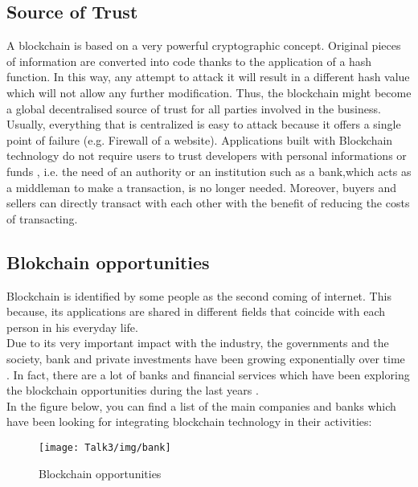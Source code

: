 \subsection{Source of Trust}
A blockchain is based on a very powerful cryptographic concept. Original pieces of information are converted into code thanks to the application of a hash function. In this way, any attempt to attack it will result in a different hash value which will not allow any further modification.
Thus, the blockchain might become a global decentralised source of trust \cite{blockchain3} for all parties involved in the business.\\
Usually, everything that is centralized is easy to attack because it offers a single point of failure (e.g. Firewall of a website). 
Applications built with Blockchain technology do not require users to trust developers with personal informations or funds \cite{blockchain3}, i.e. the need of an authority or an institution such as a bank,which acts as a middleman to make a transaction, is no longer needed. Moreover, buyers and sellers can directly transact with each other with the benefit of reducing the costs of transacting.

\subsection{Blokchain opportunities}
Blockchain is identified by some people as the second coming of internet. This because, its applications are shared in different fields that coincide with each person in his everyday life. \\
Due to its very important impact with the industry, the governments and the society, bank and private investments have been growing exponentially over time \cite{soci}. In fact, there are a lot of banks and financial services which have been exploring the blockchain opportunities during the last years \cite{soci}. \\

In the figure below, you can find a list of the main companies and banks which have been looking for integrating blockchain technology in their activities: 
           \begin{figure}[H]
         \begin{center}
         \texttt{[image: Talk3/img/bank]}
         \end{center}
         \caption{Blockchain opportunities}
         \label{label}
       \end{figure}
